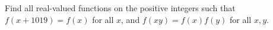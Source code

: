 Find all real-valued functions on the positive integers such that $f(x + 1019) = f(x)$ for all $x$, and $f(xy) = f(x) f(y)$ for all $x,y$.